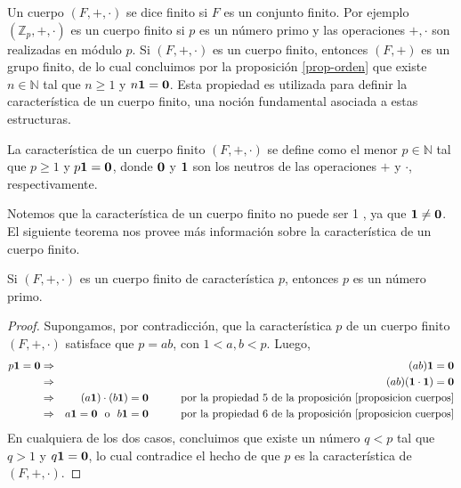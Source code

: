 Un cuerpo $(F,+,\cdot)$ se dice finito si $F$ es un conjunto
finito. Por ejemplo $(\mathbb{Z}_p, +, \cdot)$ es un cuerpo finito si
$p$ es un número primo y las operaciones $+, \cdot$ son realizadas en
módulo $p$.
Si $(F,+,\cdot)$ es un cuerpo finito, entonces $(F,+)$ es un grupo
finito, de lo cual concluimos por la proposición \ref{prop-orden} que
existe $n \in \mathbb{N}$ tal que $n \geq 1$ y $n \mathbf{1} = \mathbf{0}$. Esta propiedad es
utilizada para definir la característica de un cuerpo finito, una
noción fundamental asociada a estas estructuras.
\begin{definition}
La característica de un cuerpo finito $(F, +, \cdot)$ se define como el menor $p\in \mathbb{N}$ tal que $p \geq 1$ y $p \mathbf{1} = \mathbf{0}$, donde $\mathbf{0}$ y $\mathbf{1}$ son los neutros de las operaciones $+$ y $\cdot$, respectivamente.
\end{definition}
Notemos que la característica de un cuerpo finito no puede ser 1 , ya
que $\mathbf{1} \neq \mathbf{0} $. El siguiente teorema nos provee más información
sobre la característica de un cuerpo finito.
\begin{theorem}\label{caracteristica primo}
Si $(F,+,\cdot)$ es un cuerpo finito de característica $p$, entonces
$p$ es un número primo.
\end{theorem}
\begin{proof}
Supongamos, por contradicción, que la característica $p$ de un cuerpo
finito $(F, +, \cdot)$ satisface que $p = ab$, con $1<a, b<p$. Luego,
\begin{eqnarray*}
	p\mathbf{1}  = \mathbf{0} &\Rightarrow & (a b)\mathbf{1} = \mathbf{0} \\
        &\Rightarrow & (a b) (\mathbf{1} \cdot \mathbf{1}) = \mathbf{0} \\
	&\Rightarrow & (a\mathbf{1}) \cdot (b\mathbf{1}) =  \mathbf{0} \quad\quad\quad \text{por la propiedad 5 de la proposición \ref{proposicion cuerpos}}\\
	&\Rightarrow& a \mathbf{1}  = \mathbf{0} \ \text{ o } \ b\mathbf{1}  = \mathbf{0} \quad\quad\quad \text{por la propiedad 6 de la proposición \ref{proposicion cuerpos}}
\end{eqnarray*}
En cualquiera de los dos casos, concluimos que existe un número $q <
p$ tal que $q > 1$ y $q \mathbf{1} = \mathbf{0}$, lo cual contradice el hecho de que
$p$ es la característica de $(F, +, \cdot)$.
\end{proof}
